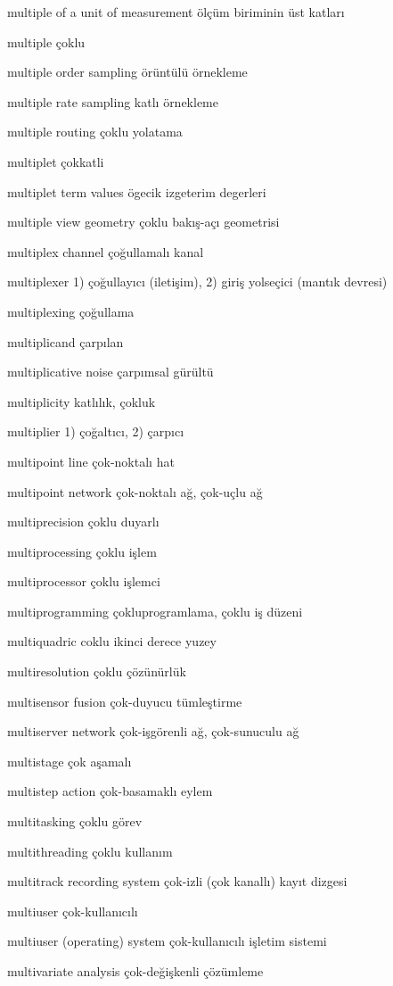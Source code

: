 \documentclass[12pt,fleqn]{article}\usepackage{../../common}
\begin{document}
multiple of a unit of measurement ölçüm biriminin üst katları

multiple çoklu

multiple order sampling örüntülü örnekleme

multiple rate sampling katlı örnekleme

multiple routing çoklu yolatama

multiplet çokkatli

multiplet term values ögecik izgeterim degerleri

multiple view geometry çoklu bakış-açı geometrisi

multiplex channel çoğullamalı kanal

multiplexer 1) çoğullayıcı (iletişim), 2) giriş yolseçici (mantık devresi)

multiplexing çoğullama

multiplicand çarpılan

multiplicative noise çarpımsal gürültü

multiplicity katlılık, çokluk

multiplier 1) çoğaltıcı, 2) çarpıcı

multipoint line çok-noktalı hat

multipoint network çok-noktalı ağ, çok-uçlu ağ

multiprecision çoklu duyarlı

multiprocessing çoklu işlem

multiprocessor çoklu işlemci

multiprogramming çokluprogramlama, çoklu iş düzeni

multiquadric coklu ikinci derece yuzey

multiresolution çoklu çözünürlük

multisensor fusion çok-duyucu tümleştirme

multiserver network çok-işgörenli ağ, çok-sunuculu ağ

multistage çok aşamalı

multistep action çok-basamaklı eylem

multitasking çoklu görev

multithreading çoklu kullanım

multitrack recording system çok-izli (çok kanallı) kayıt dizgesi

multiuser çok-kullanıcılı

multiuser (operating) system çok-kullanıcılı işletim sistemi

multivariate analysis çok-değişkenli çözümleme
\end{document}
